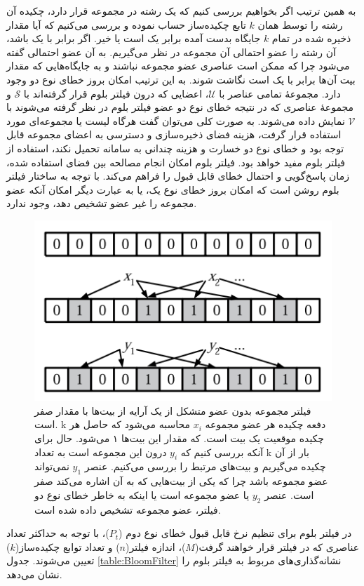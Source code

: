 به همین ترتیب اگر بخواهیم بررسی کنیم که یک رشته در مجموعه قرار دارد، چکیده آن رشته را توسط همان $k$ تابع چکیده‌ساز حساب نموده و بررسی می‌کنیم که آیا مقدار ذخیره شده در تمام $k$ جایگاه بدست آمده برابر یک است یا خیر. اگر برابر با یک باشد، آن رشته را عضو احتمالی آن مجموعه در نظر می‌گیریم. به آن عضو احتمالی گفته می‌شود چرا که ممکن است عناصری عضو مجموعه نباشند و به جایگاه‌هایی که مقدار  بیت آن‌ها برابر با یک است نگاشت شوند. به این ترتیب امکان بروز خطای نوع دو وجود دارد. مجموعهٔ تمامی عناصر با $\mathcal{U}$، اعضایی که درون فیلتر بلوم قرار گرفته‌اند با $\mathcal{S}$ و مجموعهٔ عناصری که در نتیجه خطای نوع دو عضو فیلتر بلوم در نظر گرفته می‌شوند با $\mathcal{V}$ نمایش داده می‌شوند. به صورت کلی می‌توان گفت هرگاه لیست یا مجموعه‌ای مورد استفاده قرار گرفت، هزینه فضای ذخیره‌سازی و دسترسی به اعضای مجموعه قابل توجه بود و خطای نوع دو خسارت و هزینه چندانی به سامانه تحمیل نکند، استفاده از فیلتر بلوم مفید خواهد بود. فیلتر بلوم امکان انجام مصالحه بین فضای استفاده شده، زمان پاسخ‌گویی و احتمال خطای قابل قبول را فراهم می‌کند\cite{Bloom1970}. با توجه به ساختار فیلتر بلوم روشن است که امکان بروز خطای نوع یک، یا به عبارت دیگر امکان آنکه عضو مجموعه را غیر عضو تشخیص دهد، وجود ندارد.

\begin{figure}
	\centering
	\includegraphics[width=0.55\linewidth]{image/BloomFilter}
	\caption[نمونه‌ای از عمکلرد فیلتر بلوم]{
		فیلتر مجموعه بدون عضو متشکل از یک آرایه‌ از بیت‌ها با مقدار صفر است. k دفعه چکیده هر عضو مجموعه $x_i$ محاسبه می‌شود که حاصل هر چکیده موقعیت یک بیت است. که مقدار این بیت‌ها ۱ می‌شود. حال برای آنکه بررسی کنیم که $y_i$ درون این مجموعه است به تعداد k بار از آن چکیده می‌گیریم و بیت‌های مرتبط را بررسی می‌کنیم. عنصر $y_1$ نمی‌تواند عضو مجموعه باشد چرا که یکی از بیت‌هایی که به آن اشاره می‌کند صفر است. عنصر $y_2$ یا عضو مجموعه است یا اینکه به خاطر خطای نوع دو فیلتر، عضو مجموعه تشخیص داده شده است.\cite{Broder2004}
	}
	\label{fig:bloomfilter}
\end{figure}

در فیلتر بلوم برای تنظیم نرخ قابل قبول خطای نوع دوم ($P_t$)، با توجه به حداکثر تعداد عناصری که در فیلتر قرار خواهند گرفت($M$)، اندازه فیلتر($n$) و تعداد توابع‌ چکیده‌ساز($k$) تعیین می‌شوند.
جدول \ref{table:BloomFilter} نشانه‌گذاری‌های مربوط به فیلتر بلوم را نشان می‌دهد.

